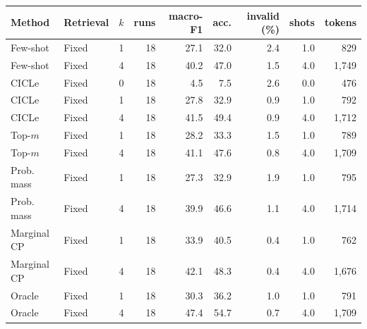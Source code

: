 \begin{tabular}{llrrrrrrr}
\toprule
Method & Retrieval & $k$ & runs & macro-F1 & acc. & invalid (\%) & shots & tokens \\
\midrule
Few-shot & Fixed & 1 & 18 & 27.1 & 32.0 & 2.4 & 1.0 & 829 \\
Few-shot & Fixed & 4 & 18 & 40.2 & 47.0 & 1.5 & 4.0 & 1,749 \\
CICLe & Fixed & 0 & 18 & 4.5 & 7.5 & 2.6 & 0.0 & 476 \\
CICLe & Fixed & 1 & 18 & 27.8 & 32.9 & 0.9 & 1.0 & 792 \\
CICLe & Fixed & 4 & 18 & 41.5 & 49.4 & 0.9 & 4.0 & 1,712 \\
\midrule
Top-$m$ & Fixed & 1 & 18 & 28.2 & 33.3 & 1.5 & 1.0 & 789 \\
Top-$m$ & Fixed & 4 & 18 & 41.1 & 47.6 & 0.8 & 4.0 & 1,709 \\
Prob. mass & Fixed & 1 & 18 & 27.3 & 32.9 & 1.9 & 1.0 & 795 \\
Prob. mass & Fixed & 4 & 18 & 39.9 & 46.6 & 1.1 & 4.0 & 1,714 \\
Marginal CP & Fixed & 1 & 18 & 33.9 & 40.5 & 0.4 & 1.0 & 762 \\
Marginal CP & Fixed & 4 & 18 & 42.1 & 48.3 & 0.4 & 4.0 & 1,676 \\
Oracle & Fixed & 1 & 18 & 30.3 & 36.2 & 1.0 & 1.0 & 791 \\
Oracle & Fixed & 4 & 18 & 47.4 & 54.7 & 0.7 & 4.0 & 1,709 \\
\bottomrule
\end{tabular}
